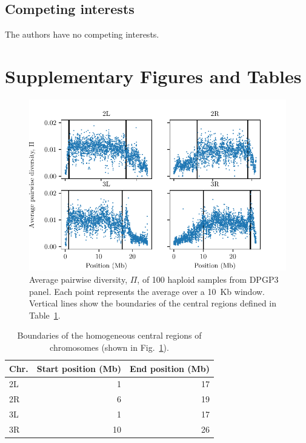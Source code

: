 \documentclass[11pt, letterpaper]{article}   	%
\newcommand{\beginsupplement}{%
        \setcounter{table}{0}
        \renewcommand{\thetable}{S\arabic{table}}%
        \setcounter{figure}{0}
        \renewcommand{\thefigure}{S\arabic{figure}}%
     }
\newcommand{\fig}[1]{Fig.~\ref{#1}}
\begin{document}
\subsection*{Competing interests}
The authors have no competing interests.

\printbibliography

\clearpage
\beginsupplement
\section*{Supplementary Figures and Tables}

\begin{figure}[ht!]
\centering
\includegraphics[scale=1]{figures/pi_vs_position.pdf}
\caption{Average pairwise diversity, $\Pi$, of 100 haploid samples from DPGP3 panel. Each point represents the average over a 10~Kb window. Vertical lines show the boundaries of the central regions defined in Table~\ref{tab:central_regions}.
\label{fig:dpgp_pi}}
\end{figure}

\begin{table}[ht!]
  \begin{center}
    \caption{Boundaries of the homogeneous central regions of chromosomes (shown in \fig{fig:dpgp_pi}).}
    \label{tab:central_regions}
    \begin{tabular}{l|r|r} %
      \textbf{Chr.} & \textbf{Start position (Mb)} & \textbf{End position (Mb)}\\
      \hline
      2L & 1 & 17\\
      2R & 6 & 19\\
      3L & 1 & 17\\
      3R & 10 & 26
    \end{tabular}
  \end{center}
\end{table}
\end{document}
